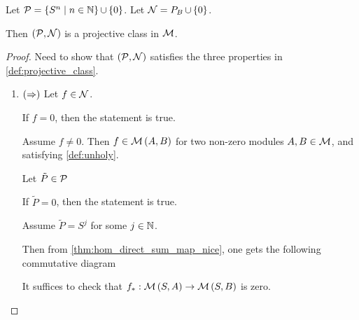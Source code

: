 \begin{example} %
    Let \( {\mathcal{P}} = \left\{  S^n \mid n \in {\mathbb{N}}  \right\} \mathop{\cup}\limits \left\{  0  \right\} \). Let \( {\mathcal{N}} = P_B \mathop{\cup}\limits \left\{  0  \right\} \).

    Then \( \left(  {\mathcal{P}}, {\mathcal{N}} \right) \) is a projective class in \( {\mathcal{M}} \).
\end{example}
\begin{proof}
    Need to show that \( \left(  {\mathcal{P}}, {\mathcal{N}}  \right) \) satisfies the three properties in \autoref{def:projective_class}.

    \begin{enumerate}
        \item {
            \( \left(  \Rightarrow  \right) \) Let \( f \in {\mathcal{N}} \).

            If \( f = 0 \), then the statement is true.

            Assume \( f \neq 0 \). Then \( f \in {\mathcal{M}}\left( A, B \right) \) for two non-zero modules \( A, B \in {\mathcal{M}} \), and satisfying \autoref{def:unholy}.
            
            Let \( \tilde{P} \in {\mathcal{P}} \)
            
            If \( \tilde{P} = 0 \), then the statement is true.

            Assume \( \tilde{P} = S^j \) for some \( j \in {\mathbb{N}} \).

            Then from \autoref{thm:hom_direct_sum_map_nice}, one gets the following commutative diagram
            \begin{center}
            \end{center}
            It suffices to check that \( f_*: {\mathcal{M}}\left( S, A \right) \to {\mathcal{M}}\left( S, B \right) \) is zero.

}
\end{enumerate}
\end{proof}
